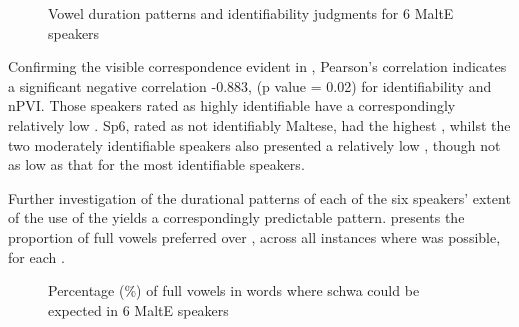 \documentclass[output=paper]{langsci/langscibook}
\begin{document}
\begin{figure}
\caption{\label{fig:key:grech2}Vowel duration patterns and identifiability judgments for 6 MaltE speakers}

\end{figure}

Confirming the visible correspondence evident in , Pearson's correlation indicates a significant negative correlation -0.883, (p value = 0.02) for identifiability and nPVI. Those speakers rated as highly identifiable have a correspondingly relatively low . Sp6, rated as not identifiably Maltese, had the highest , whilst the two moderately identifiable  speakers also presented a relatively low , though not as low as that for the most identifiable speakers. 

Further investigation of the  durational patterns of each of the six  speakers’ extent of the use of the   yields a correspondingly predictable pattern.  presents the proportion of full vowels preferred over , across all instances where  was possible, for each .

\begin{figure}
  \caption{\label{fig:key:grech3}Percentage (\%) of full vowels in words where schwa could be expected in 6 MaltE speakers}
\end{figure}
\end{document}
